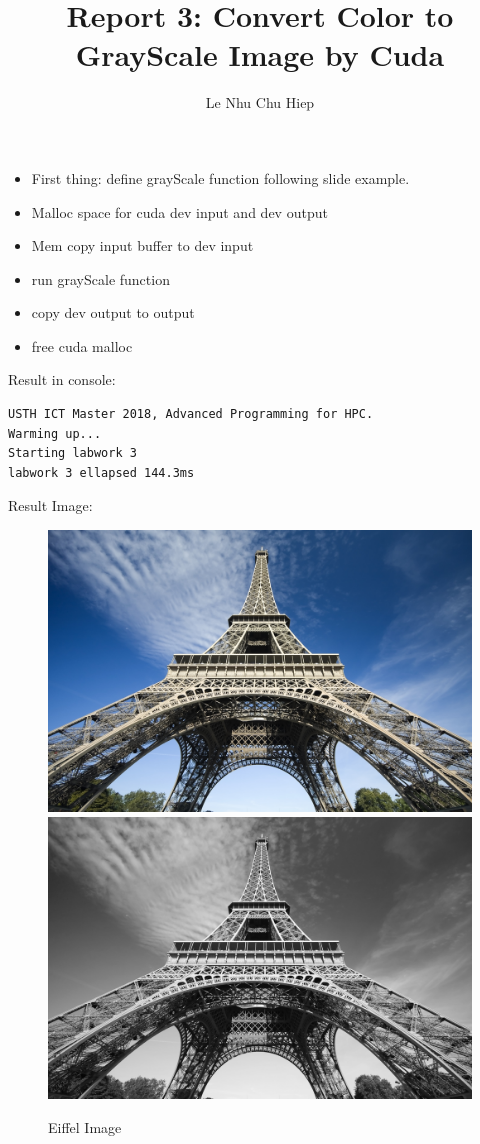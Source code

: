\documentclass{article}
\title{Report 3: Convert Color to GrayScale Image by Cuda}
\author{Le Nhu Chu Hiep}
\begin{document}
\maketitle

\begin{itemize}
    \item First thing: define grayScale function following slide example.
    \item Malloc space for cuda dev input and dev output
    \item Mem copy input buffer to dev input
    \item run grayScale function
    \item copy dev output to output
    \item free cuda malloc
\end{itemize}

Result in console:
\begin{verbatim}
USTH ICT Master 2018, Advanced Programming for HPC.
Warming up...
Starting labwork 3
labwork 3 ellapsed 144.3ms
\end{verbatim}

Result Image:
\begin{figure}
        \includegraphics{./labwork/data/eiffel.jpg}
        \includegraphics{./labwork3-gpu-out.jpg}
        \caption{Eiffel Image}
\end{figure}
\end{document}
